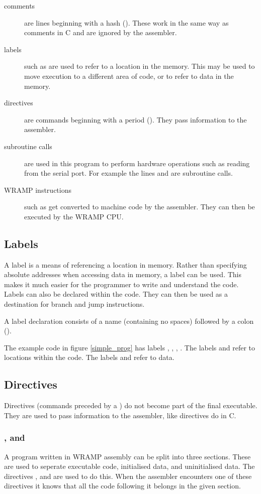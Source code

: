 \begin{description}
\item[comments] are lines beginning with a hash (\src{\#}). These work in
the same way as \src{//} comments in C and are ignored by the assembler.
%
\item[labels] such as  are used to refer to a location in the
memory. This may be used to move execution to a different area of code,
or to refer to data in the memory.
%
\item[directives] are commands beginning with a period (). They
pass information to the assembler.
%
\item[subroutine calls] are used in this program to perform hardware
operations such as reading from the serial port. For example the
lines  and  are subroutine calls.
%
\item[WRAMP instructions] such as  get
converted to machine code by the assembler. They can then be executed by the
WRAMP CPU.
%
\end{description}

\subsection{Labels}
A label is a means of referencing a location in memory. Rather than
specifying absolute addresses when accessing data in memory, a label
can be used. This makes it much easier for the programmer to write
and understand the code. Labels can also be declared within the
code. They can then be used as a destination for branch and jump
instructions.

A label declaration consists of a name (containing no spaces) followed
by a colon (\src{:}).

The example code in figure \ref{simple_prog} has labels ,
, , . The labels
 and  refer to locations within the code. The
labels  and  refer to data.

\subsection{Directives}
Directives (commands preceded by a ) do not become part of the
final executable. They are used to pass information to the assembler,
like \src{\#} directives do in C.

\subsubsection{\text, \data and \bss}
A program written in WRAMP assembly can be split into three sections.
These are used to seperate executable code, initialised data, and
uninitialised data. The directives \text, \data and \bss are used to
do this. When the assembler encounters one of these directives it
knows that all the code following it belongs in the given section.

